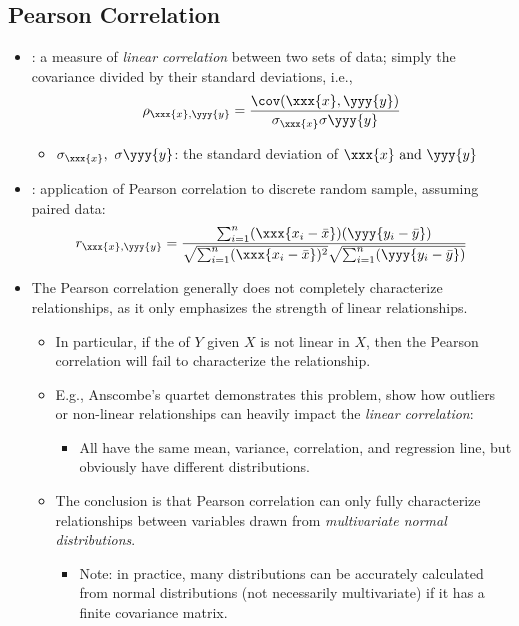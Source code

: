 \begin{itemize}
  \subsection{Pearson Correlation}
  \begin{itemize}
    \item {}: a measure of \emph{linear correlation} between two sets of data; simply the covariance divided by their standard deviations, i.e.,
    \[%
    \rho_{\xxx{x},\yyy{y}} = \frac{\cov(\xxx{x},\yyy{y})}{\sigma_\xxx{x}\sigma\yyy{y}}
    \]%
    \begin{itemize}
      \item \(\sigma_\xxx{x},~\sigma\yyy{y}\): the standard deviation of \(\xxx{x}~\text{and}~\yyy{y}\)
    \end{itemize}
    \item {}: application of Pearson correlation to discrete random sample, assuming paired data:
    \[%
    r_{\xxx{x},\yyy{y}} = \frac{\sum_{i = 1}^{n}(\xxx{x_i-\bar{x}})(\yyy{y_i-\bar{y}})}
    {\sqrt{\sum_{i = 1}^{n}(\xxx{x_i-\bar{x}})^2}\sqrt{\sum_{i = 1}^{n}(\yyy{y_i-\bar{y}})}}
    \]%
    \item The Pearson correlation generally does not completely characterize relationships, as it only emphasizes the strength of linear relationships.
      \begin{itemize}
        \item In particular, if the  of \(Y\) given \(X\) is not linear in \(X\), then the Pearson correlation will fail to characterize the relationship.
        \item E.g., Anscombe's quartet demonstrates this problem, show how outliers or non-linear relationships can heavily impact the \emph{linear correlation}: 
        \begin{center}
          \hspace{-32pt}
        \end{center}
        \begin{itemize}
          \item All have the same mean, variance, correlation, and regression line, but obviously have different distributions.
        \end{itemize}
        \item The conclusion is that Pearson correlation can only fully characterize relationships between variables drawn from \emph{multivariate normal distributions}.
          \begin{itemize}
            \item Note: in practice, many distributions can be accurately calculated from normal distributions (not necessarily multivariate) if it has a finite covariance matrix. 
          \end{itemize}
      \end{itemize}
  \end{itemize}


\end{itemize}
